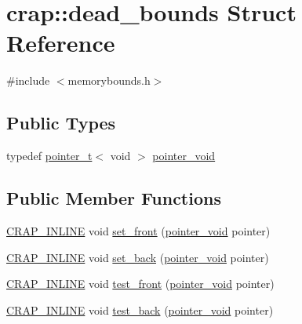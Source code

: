 \hypertarget{structcrap_1_1dead__bounds}{}\section{crap\+:\+:dead\+\_\+bounds Struct Reference}
\label{structcrap_1_1dead__bounds}


{\ttfamily \#include $<$memorybounds.\+h$>$}

\subsection*{Public Types}
\begin{DoxyCompactItemize}
\item 
typedef \hyperlink{structcrap_1_1pointer__t}{pointer\+\_\+t}$<$ void $>$ \hyperlink{structcrap_1_1dead__bounds_a1f3c4f9646f45b9c4f1dc351d94e96bb}{pointer\+\_\+void}
\end{DoxyCompactItemize}
\subsection*{Public Member Functions}
\begin{DoxyCompactItemize}
\item 
\hyperlink{config__x86_8h_a5a40526b8d842e7ff731509998bb0f1c}{C\+R\+A\+P\+\_\+\+I\+N\+L\+I\+N\+E} void \hyperlink{structcrap_1_1dead__bounds_a1bfb142b57529ff4fe654b17d52014c2}{set\+\_\+front} (\hyperlink{structcrap_1_1dead__bounds_a1f3c4f9646f45b9c4f1dc351d94e96bb}{pointer\+\_\+void} pointer)
\item 
\hyperlink{config__x86_8h_a5a40526b8d842e7ff731509998bb0f1c}{C\+R\+A\+P\+\_\+\+I\+N\+L\+I\+N\+E} void \hyperlink{structcrap_1_1dead__bounds_a95e8c5c9645fe122540da759011f73ce}{set\+\_\+back} (\hyperlink{structcrap_1_1dead__bounds_a1f3c4f9646f45b9c4f1dc351d94e96bb}{pointer\+\_\+void} pointer)
\item 
\hyperlink{config__x86_8h_a5a40526b8d842e7ff731509998bb0f1c}{C\+R\+A\+P\+\_\+\+I\+N\+L\+I\+N\+E} void \hyperlink{structcrap_1_1dead__bounds_afd0269524e68c78f0365418e508c0012}{test\+\_\+front} (\hyperlink{structcrap_1_1dead__bounds_a1f3c4f9646f45b9c4f1dc351d94e96bb}{pointer\+\_\+void} pointer)
\item 
\hyperlink{config__x86_8h_a5a40526b8d842e7ff731509998bb0f1c}{C\+R\+A\+P\+\_\+\+I\+N\+L\+I\+N\+E} void \hyperlink{structcrap_1_1dead__bounds_aaae6140a63d70ae61887a2216bafebe4}{test\+\_\+back} (\hyperlink{structcrap_1_1dead__bounds_a1f3c4f9646f45b9c4f1dc351d94e96bb}{pointer\+\_\+void} pointer)
\end{DoxyCompactItemize}
